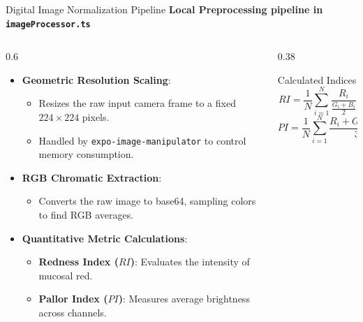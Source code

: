 \documentclass[aspectratio=169]{beamer}
\begin{document}
\begin{frame}{Digital Image Normalization Pipeline}
    \textbf{Local Preprocessing pipeline in \texttt{imageProcessor.ts}}
    \begin{columns}[T]
        \begin{column}{0.6\textwidth}
            \begin{itemize}
                \item \textbf{Geometric Resolution Scaling}:
                \begin{itemize}
                    \item Resizes the raw input camera frame to a fixed $224 \times 224$ pixels.
                    \item Handled by \texttt{expo-image-manipulator} to control memory consumption.
                \end{itemize}
                \item \textbf{RGB Chromatic Extraction}:
                \begin{itemize}
                    \item Converts the raw image to base64, sampling colors to find RGB averages.
                \end{itemize}
                \item \textbf{Quantitative Metric Calculations}:
                \begin{itemize}
                    \item \textbf{Redness Index ($RI$)}: Evaluates the intensity of mucosal red.
                    \item \textbf{Pallor Index ($PI$)}: Measures average brightness across channels.
                \end{itemize}
            \end{itemize}
        \end{column}
        \begin{column}{0.38\textwidth}
            \begin{block}{Calculated Indices}
                \begin{equation*}
                    RI = \frac{1}{N} \sum_{i=1}^{N} \frac{R_i}{\frac{G_i + B_i}{2}}
                \end{equation*}
                \begin{equation*}
                    PI = \frac{1}{N} \sum_{i=1}^{N} \frac{R_i + G_i + B_i}{3}
                \end{equation*}
            \end{block}
        \end{column}
    \end{columns}
\end{frame}
\end{document}
